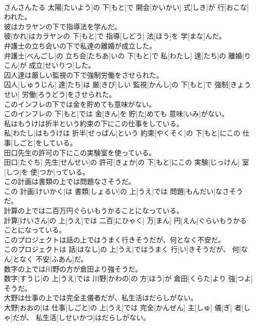 \documentclass[8pt]{extreport}
\begin{document}
\begin{CJK}{UTF8}{min}
\\	さんさんたる 太陽[たいよう]の 下[もと]で 開会[かいかい] 式[しき]が 行[おこな]われた。
\\	彼はカラヤンの下で指導法を学んだ。	
\\	彼[かれ]はカラヤンの 下[もと]で 指導[しどう] 法[ほう]を 学[まな]んだ。
\\	弁護士の立ち会いの下で私達の離婚が成立した。	
\\	弁護士[べんごし]の 立ち会[たちあ]いの 下[もと]で 私[わたし] 達[たち]の 離婚[りこん]が 成立[せいりつ]した。
\\	囚人達は厳しい監視の下で強制労働をさせられた。	
\\	囚人[しゅうじん] 達[たち]は 厳[きび]しい 監視[かんし]の 下[もと]で 強制[きょうせい] 労働[ろうどう]をさせられた。
\\	このインフレの下では金を貯めても意味がない。	
\\	このインフレの 下[もと]では 金[きん]を 貯[た]めても 意味[いみ]がない。
\\	私はもうけは折半という約束の下にこの仕事をしている。	
\\	私[わたし]はもうけは 折半[せっぱん]という 約束[やくそく]の 下[もと]にこの 仕事[しごと]をしている。
\\	田口先生の許可の下にこの実験室を使っている。	
\\	田口[たぐち] 先生[せんせい]の 許可[きょか]の 下[もと]にこの 実験[じっけん] 室[しつ]を 使[つか]っている。
\\	この計画は書類の上では問題なさそうだ。	
\\	この 計画[けいかく]は 書類[しょるい]の 上[うえ]では 問題[もんだい]なさそうだ。
\\	計算の上では二百万円ぐらいもうかることになっている。	
\\	計算[けいさん]の 上[うえ]では 二百[にひゃく] 万[まん] 円[えん]ぐらいもうかることになっている。
\\	このプロジェクトは話の上ではうまく行きそうだが、何となく不安だ。	
\\	このプロジェクトは 話[はなし]の 上[うえ]ではうまく 行[い]きそうだが、 何[なん]となく 不安[ふあん]だ。
\\	数字の上では川野の方が倉田より強そうだ。	
\\	数字[すうじ]の 上[うえ]では 川野[かわの]の 方[ほう]が 倉田[くらた]より 強[つよ]そうだ。
\\	大野は仕事の上では完全主儀者だが、私生活はだらしがない。	
\\	大野[おおの]は 仕事[しごと]の 上[うえ]では 完全[かんぜん] 主[しゅ] 儀[ぎ] 者[しゃ]だが、 私生活[しせいかつ]はだらしがない。

\end{CJK}
\end{document}
